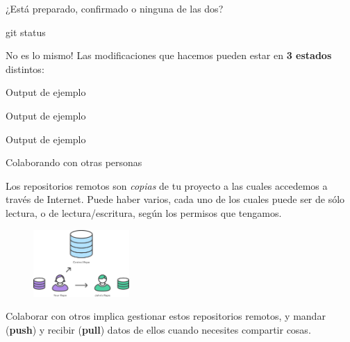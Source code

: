 \begin{frame}[fragile, t]{¿Está preparado, confirmado o ninguna de las dos?}
    \begin{comando}
        git status
    \end{comando}

    \begin{block}{No es lo mismo!}
        Las modificaciones que hacemos pueden estar en \textbf{3 estados} distintos:
        \begin{itemize}
            \pause
        \end{itemize}
    \end{block}

     {
        \begin{block}{Output de ejemplo}
            \gitstatusmodified
        \end{block}
    }
     {
        \begin{block}{Output de ejemplo}
            \gitstatusready
        \end{block}
    }
     {
        \begin{block}{Output de ejemplo}
            \gitstatusclean
        \end{block}
    }
\end{frame}

\begin{frame}{Colaborando con otras personas}

    Los repositorios remotos son \textit{copias} de tu proyecto a las cuales accedemos a través
    de Internet. Puede haber varios, cada uno de los cuales
    puede ser de sólo lectura, o de lectura/escritura, según los permisos que tengamos.

    \begin{figure}[ht]
        \begin{center}
            \includegraphics[height=1in]{images/repo-remoto.png}
        \end{center}
    \end{figure}

    Colaborar con otros implica gestionar estos repositorios remotos, y mandar (\textbf{push}) y recibir (\textbf{pull})
    datos de ellos cuando necesites compartir cosas.

\end{frame}

